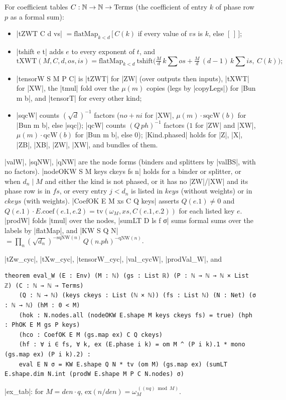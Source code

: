\begin{definition}\label{def:lean-core-tensorW}
For coefficient tables $C:\mathbb{N}\to\mathbb{N}\to\mathrm{Terms}$ (the coefficient of entry $k$ of phase row $p$ as a formal sum):
\begin{itemize}
\item \lean|tZWT C d vs| $=\mathrm{flatMap}_{k<d}\,[\,C(k)$ if every value of $vs$ is $k$, else $[\,]\,]$;
\item \lean|tshift e t| adds $e$ to every exponent of $t$, and
\[
\mathrm{tXWT}(M,C,d,os,is)=\mathrm{flatMap}_{k<d}\ \mathrm{tshift}\bigl(\tfrac Md\,k\textstyle\sum os+\tfrac Md\,(d-1)\,k\sum is,\ C(k)\bigr);
\]
\item \lean|tensorW S M P C| is \lean|tZWT| for \lean|ZW| (over outputs then inputs), \lean|tXWT| for \lean|XW|, the \lean|tmul| fold over the $\mu(m)$ copies (legs by \lean|copyLegs|) for \lean|Bun m b|, and \lean|tensorT| for every other kind;
\item \lean|sqcW| counts $(\sqrt d)^{-1}$ factors ($no+ni$ for \lean|XW|, $\mu(m)\cdot\mathrm{sqcW}(b)$ for \lean|Bun m b|, else \lean|sqc|); \lean|qcW| counts $(Q\,ph)^{-1}$ factors ($1$ for \lean|ZW| and \lean|XW|, $\mu(m)\cdot\mathrm{qcW}(b)$ for \lean|Bun m b|, else $0$); \lean|Kind.phased| holds for \lean|Z|, \lean|X|, \lean|ZB|, \lean|XB|, \lean|ZW|, \lean|XW|, and bundles of them.
\end{itemize}
\lean|valW|, \lean|sqNW|, \lean|qNW| are the node forms (binders and splitters by \lean|valBS|, with no factors). \lean|nodeOKW S M keys ckeys fs n| holds for a binder or splitter, or when $d_n\mid M$ and either the kind is not phased, or it has no \lean|ZW|/\lean|XW| and its phase row is in $fs$, or every entry $j<d_n$ is listed in $keys$ (without weights) or in $ckeys$ (with weights). \lean|CoefOK E M xs C Q keys| asserts $Q(e.1)\ne 0$ and $Q(e.1)\cdot E.\mathrm{coef}(e.1,e.2)=\mathrm{tv}(\omega_M,xs,C(e.1,e.2))$ for each listed key $e$. \lean|prodW| folds \lean|tmul| over the nodes, \lean|sumLT D ls f σ| sums formal sums over the labels by \lean|flatMap|, and \lean|KW S Q N| $=\prod_n(\sqrt{d_n})^{-\mathrm{sqNW}(n)}\,Q(n.ph)^{-\mathrm{qNW}(n)}$.
\end{definition}

\begin{theorem}\label{thm:lean-core-eval-W}
\lean|tZw_cyc|, \lean|tXw_cyc|, \lean|tensorW_cyc|, \lean|val_cycW|, \lean|prodVal_W|, and
\begin{lstlisting}[style=lean]
theorem eval_W (E : Env) (M : ℕ) (gs : List ℝ) (P : ℕ → ℕ → ℕ × List ℤ) (C : ℕ → ℕ → Terms)
    (Q : ℕ → ℕ) (keys ckeys : List (ℕ × ℕ)) (fs : List ℕ) (N : Net) (σ : ℕ → ℕ) (hM : 0 < M)
    (hok : N.nodes.all (nodeOKW E.shape M keys ckeys fs) = true) (hph : PhOK E M gs P keys)
    (hco : CoefOK E M (gs.map ex) C Q ckeys)
    (hf : ∀ i ∈ fs, ∀ k, ex (E.phase i k) = om M ^ (P i k).1 * mono (gs.map ex) (P i k).2) :
    eval E N σ = KW E.shape Q N * tv (om M) (gs.map ex) (sumLT E.shape.dim N.int (prodW E.shape M P C N.nodes) σ)
\end{lstlisting}
\lean|ex_tab|: for $M=\mathit{den}\cdot q$, $\mathrm{ex}(n/\mathit{den})=\omega_M^{\,((nq)\bmod M)}$.
\end{theorem}

